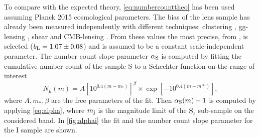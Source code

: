 To compare with the expected theory, \autoref{eq:numbercounttheo} has been used assuming Planck 2015 \cite{2016A&A...594A..13P} cosmological parameters. The bias of the lens sample has already been measured independently with different techniques: clustering \cite{2016MNRAS.455.4301C}, gg-lensing \cite{2016arXiv160908167P}, shear \cite{2016MNRAS.459.3203C} and CMB-lensing \cite{2016MNRAS.456.3213G}. From these values the most precise, from \cite{2016MNRAS.455.4301C}, is selected ($b_{\rm L}=1.07\pm0.08$) and is assumed to be a constant scale-independent parameter. The number count slope parameter $\alpha_{\rm S}$ is computed by fitting the cumulative number count of the sample S to a Schechter function \cite{1976ApJ...203..297S} on the range of interest
\begin{equation}
N_\mu(m) = A\left[10^{0.4(m-m_*)}\right]^\beta\times\exp\left[-10^{0.4(m-m*)}\right],
\label{eq:sch}
\end{equation}
where $A,m_*,\beta$ are the free parameters of the fit. Then $\alpha_{\rm S}(m)-1$ is computed by applying \autoref{eq:alpha}, where $m_{\rm j}$ is the magnitude limit of the $\rm S_j$ sub-sample on the considered band. In \autoref{fig:alphai} the fit and the number count slope parameter for the I sample are shown.
